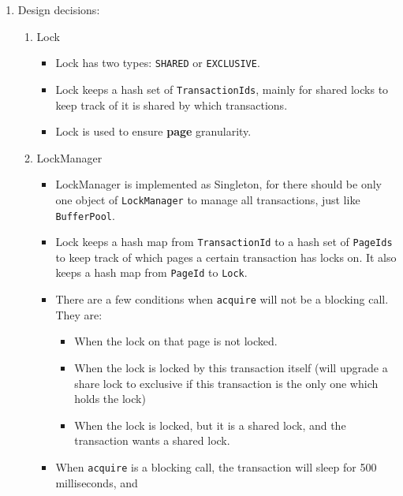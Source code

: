 \documentclass[10pt]{myland}
\begin{document}
\begin{enumerate}[label=\textbf{\arabic*.}, listparindent=0.0em, itemsep=2em]
    \item Design decisions:
        \begin{enumerate}[itemsep=1.5em]
            \item Lock
                \begin{itemize}
                    \setlength\itemsep{1em}
                    \item Lock has two types: \texttt{SHARED} or \texttt{EXCLUSIVE}.
                    \item Lock keeps a hash set of \texttt{TransactionIds}, mainly for shared locks to keep track of
                        it is shared by which transactions.
                    \item Lock is used to ensure \textbf{page} granularity.
                \end{itemize}
            \item LockManager
                \begin{itemize}
                    \setlength\itemsep{1em}
                    \item LockManager is implemented as Singleton, for there should be only one object of
                        \texttt{LockManager} to manage all transactions, just like \texttt{BufferPool}.
                    \item Lock keeps a hash map from \texttt{TransactionId} to a hash set of \texttt{PageIds} to keep
                        track of which pages a certain transaction has locks on. It also keeps a hash map from \texttt{PageId}
                        to \texttt{Lock}.
                    \item There are a few conditions when \texttt{acquire} will not be a blocking call. They are:
                        \begin{itemize}
                            \item When the lock on that page is not locked.
                            \item When the lock is locked by this transaction itself (will upgrade a share lock to
                                exclusive if this transaction is the only one which holds the lock)
                            \item When the lock is locked, but it is a shared lock, and the transaction wants a shared lock.
                        \end{itemize}
                    \item When \texttt{acquire} is a blocking call, the transaction will sleep for 500 milliseconds, and

\end{itemize}
\end{enumerate}
\end{enumerate}
\end{document}
